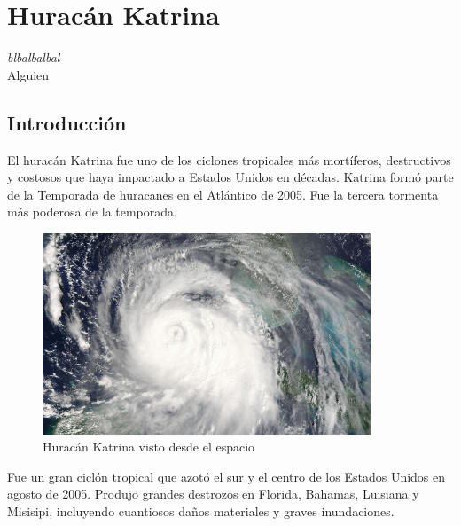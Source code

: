 \chapter{Huracán Katrina} \label{cap0b}

\begin{flushright}
\begin{minipage}{7.85cm}
    {\em blbalbalbal} \\ Alguien %
\end{minipage}
\end{flushright}

\vspace*{5mm}

\section{Introducción}

El huracán Katrina fue uno de los ciclones tropicales más mortíferos,
destructivos y costosos que haya impactado a Estados Unidos en décadas. Katrina
formó parte de la Temporada de huracanes en el Atlántico de 2005. Fue la tercera
tormenta más poderosa de la temporada.

\begin{figure}[H]
 \centering
 \includegraphics[height=60mm]{figuras/cap0/hurricane.png}
 \caption{Huracán Katrina visto desde el espacio}
\end{figure}

Fue un gran ciclón tropical que azotó el sur y el centro de los Estados Unidos
en agosto de 2005. Produjo grandes destrozos en Florida, Bahamas, Luisiana y
Misisipi, incluyendo cuantiosos daños materiales y graves inundaciones.

